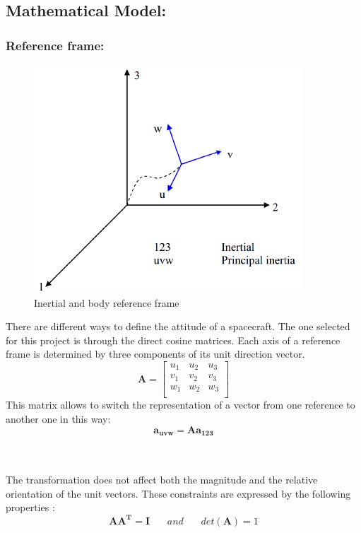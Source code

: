 \documentclass[11pt]{article}
\begin{document}
\subsection{Mathematical Model:}
\subsubsection{Reference frame:}
\begin{minipage}{.5\textwidth}
\begin{figure} [H]
\centering 
\includegraphics[scale=0.9]{reference_frame.PNG}
\caption{ Inertial and body reference frame
\cite{reference_frame}}
\end{figure}
\end{minipage}
\begin{minipage}{.5\textwidth}
There are different ways to define the attitude of a spacecraft. The one selected for this project is through the direct cosine matrices. Each axis of a reference frame is determined by three components of its unit direction vector. 
\begin{equation}
\mathbf{A}=\begin{bmatrix}
u_1 & u_2 & u_3 \\
v_1& v_2 & v_3 \\
w_1 & w_2 & w_3 \\
\end{bmatrix}
\end{equation}
This matrix allows to switch the representation of a vector from one reference to another one in this way:
\begin{equation}
\mathbf{a_{uvw}} = \mathbf{A} \mathbf{a_{123}}
\end{equation}
\end{minipage}
\\\\
The transformation does not affect both the magnitude and the relative orientation of the unit vectors. These constraints are expressed by the following properties :
\begin{equation}
\mathbf{A}\mathbf{A^T}=\mathbf{I} \ \ \ \ \ \ \ \ and \ \ \ \ \ \ \ \  det(\mathbf{A})=1
\end{equation}
\end{document}
